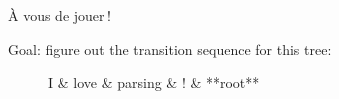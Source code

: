 \documentclass[
	hyperref={unicode},
	xcolor={svgnames, table},
	aspectratio=169,
	french,
]{beamer}
\begin{document}
\begin{frame}{À vous de jouer !}
		\begin{overlayarea}{\textwidth}{0.8\textheight}
	\begin{block}{}
	Goal: figure out the transition sequence for this tree:
	\end{block}
	\begin{figure}
			\begin{dependency}[theme=simple]
					\begin{deptext}[column sep=1em]
							I \& love \& parsing \& ! \& **root**\\
					\end{deptext}
			\end{dependency}
	\end{figure}


\end{overlayarea}
\end{frame}
\end{document}
